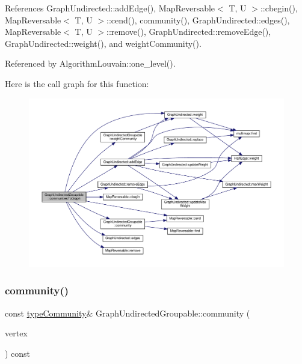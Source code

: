 References Graph\+Undirected\+::add\+Edge(), Map\+Reversable$<$ T, U $>$\+::cbegin(), Map\+Reversable$<$ T, U $>$\+::cend(), community(), Graph\+Undirected\+::edges(), Map\+Reversable$<$ T, U $>$\+::remove(), Graph\+Undirected\+::remove\+Edge(), Graph\+Undirected\+::weight(), and weight\+Community().



Referenced by Algorithm\+Louvain\+::one\+\_\+level().

Here is the call graph for this function\+:
\nopagebreak
\begin{figure}[H]
\begin{center}
\leavevmode
\includegraphics[width=350pt]{classGraphUndirectedGroupable_af6fc2c9e8aad7c6bce37d30eeaf184a8_cgraph}
\end{center}
\end{figure}
\mbox{\label{classGraphUndirectedGroupable_ad40474d566b3f9fbe9d132fbbe562ed5}} 
\subsubsection{\texorpdfstring{community()}{community()}\hspace{0.1cm}{\footnotesize\ttfamily [1/2]}}
{\footnotesize\ttfamily const \hyperlink{graphUndirectedGroupable_8h_a914da95c9ea7f14f4b7f875c36818556}{type\+Community}\& Graph\+Undirected\+Groupable\+::community (\begin{DoxyParamCaption}\item[{const \hyperlink{edge_8h_a5fbd20c46956d479cb10afc9855223f6}{type\+Vertex} \&}]{vertex }\end{DoxyParamCaption}) const\hspace{0.3cm}{\ttfamily [inline]}}


